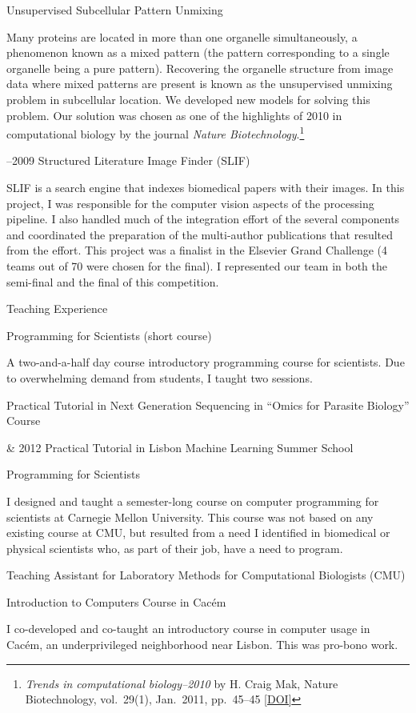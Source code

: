 \documentclass{article}
\renewcommand\section[1]{%
    \par\vspace{2em}\penalty-100%
    {\subhead #1}%
    \par\penalty100\vspace{1em}\penalty100%
}
\newcommand\cvitem[2][\relax]{%
    \par\vspace{.8em}
    \if\relax#1\else{\Date \textcolor{medg}{#1}}\hspace{1em}\fi%
    {\CvItem #2}%
    \par\vspace{.4em}
}
\newcommand\showdoi[1]{%
    \href{http://dx.doi.org/#1}{[DOI]}%
}
\begin{document}
\cvitem[2010]{Unsupervised Subcellular Pattern Unmixing}
Many proteins are located in more than one organelle simultaneously, a
phenomenon known as a mixed pattern (the pattern corresponding to a single
organelle being a pure pattern). Recovering the organelle structure from image
data where mixed patterns are present is known as the unsupervised unmixing
problem in subcellular location. We developed new models for
solving this problem. Our solution was chosen as one of the highlights of 2010
in computational biology by the journal \emph{Nature Biotechnology}.\footnote{%
\emph{Trends in computational biology--2010} by H. Craig Mak, Nature
Biotechnology, vol.\ 29(1), Jan.\ 2011, pp.\ 45--45 \showdoi{10.1038/nbt.1747}}

\cvitem[2008--2009]{Structured Literature Image Finder (SLIF)}
SLIF is a search engine that indexes biomedical papers with their images. In
this project, I was responsible for the computer vision aspects of the
processing pipeline. I also handled much of the integration effort of the
several components and coordinated the preparation of the multi-author
publications that resulted from the effort. This project was a finalist in the
Elsevier Grand Challenge (4 teams out of 70 were chosen for the final). I
represented our team in both the semi-final and the final of this competition.

\break
\section{Teaching Experience}

\cvitem[2012]{Programming for Scientists (short course)}
A two-and-a-half day course introductory programming course for scientists. Due
to overwhelming demand from students, I taught two sessions.

\cvitem[2012]{Practical Tutorial in Next Generation Sequencing in ``Omics for Parasite Biology'' Course}
\cvitem[2011 \& 2012]{Practical Tutorial in Lisbon Machine Learning Summer School}

\cvitem[2009]{Programming for Scientists}
I designed and taught a semester-long course on computer programming for
scientists at Carnegie Mellon University. This course was not based on any
existing course at CMU, but resulted from a need I identified in biomedical or
physical scientists who, as part of their job, have a need to program.

\cvitem[2008]{Teaching Assistant for Laboratory Methods for Computational Biologists (CMU)}
\cvitem[2005]{Introduction to Computers Course in Cacém}
I co-developed and co-taught an introductory course in computer usage in
Cacém, an underprivileged neighborhood near Lisbon. This was pro-bono work.
\end{document}
